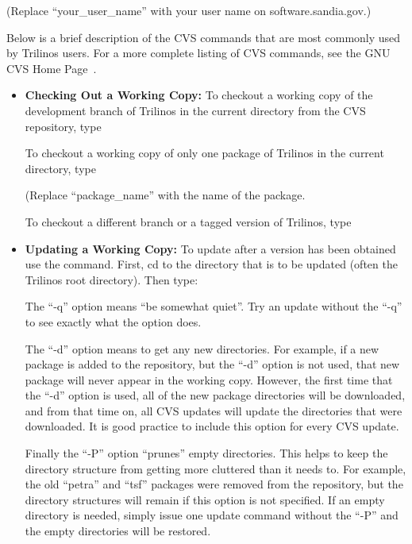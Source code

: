 \documentclass[12pt,relax]{TrilinosUserGuide}
\begin{document}

(Replace ``your\_user\_name'' with your user name on software.sandia.gov.)

Below is a brief description of the CVS commands that are most commonly
used by Trilinos users.  For a
more complete listing of CVS commands, see the GNU CVS Home Page~\cite{CVS}.

\begin{itemize}
\item {\bf Checking Out a Working Copy:}
To checkout a working copy of the development branch of Trilinos in the
current directory from the CVS repository, type


To checkout a working copy of only one package of Trilinos in the
current directory, type


(Replace ``package\_name'' with the name of the package.

To checkout a different branch or a tagged version of Trilinos, type


\item {\bf Updating a Working Copy:}
To update after a version has been obtained use the 
command.  First, cd to the directory that is to be updated (often the
Trilinos root directory).  Then type:


The ``-q'' option means ``be somewhat quiet''.  Try an update without the
``-q'' to see exactly what the option does.

The ``-d'' option means to get any new directories.  For example, if a new
package is added to the repository, but the ``-d'' option is not used, that
new package will never appear in the working copy.  However, the first time
that the ``-d'' option is used, all of the new package directories will be
downloaded, and from that time on, all CVS updates will update the
directories that were downloaded.  It is good practice to include this
option for every CVS update.

Finally the ``-P'' option ``prunes'' empty directories.  This helps to keep
the directory structure from getting more cluttered than it needs to.  For
example, the old ``petra'' and ``tsf'' packages were removed from the
repository, but the directory structures will remain if this option is not
specified.  If an empty directory is needed, simply issue one update
command without the ``-P'' and the empty directories will be restored.


\end{itemize}

\end{document}
